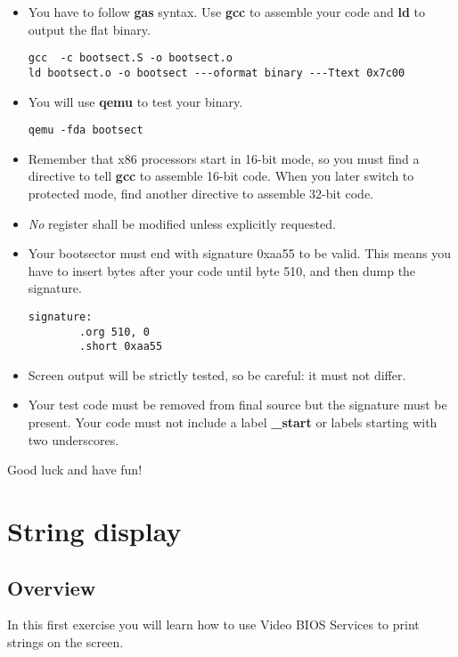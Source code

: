 \begin{itemize}
\item
  You have to follow \textbf{gas} syntax. Use \textbf{gcc} to assemble your
  code and \textbf{ld} to output the flat binary.
  \begin{verbatim}
gcc  -c bootsect.S -o bootsect.o
ld bootsect.o -o bootsect ---oformat binary ---Ttext 0x7c00
  \end{verbatim}
\item
  You will use \textbf{qemu} to test your binary.
  \begin{verbatim}
qemu -fda bootsect
  \end{verbatim}
\item
  Remember that x86 processors start in 16-bit mode, so you must find a
  directive to tell \textbf{gcc} to assemble 16-bit code. When you later
  switch to protected mode, find another directive to assemble 32-bit code.
\item
  \emph{No} register shall be modified unless explicitly requested.
\item
  Your bootsector must end with signature 0xaa55 to be valid. This means you
  have to insert bytes after your code until byte 510, and then dump the
  signature.
  \begin{verbatim}
signature:
        .org 510, 0
        .short 0xaa55
  \end{verbatim}
\item
  Screen output will be strictly tested, so be careful: it must not differ.
\item
  Your test code must be removed from final source but the signature must be
  present. Your code must not include a label \textbf{\_start} or labels
  starting with two underscores.
\end{itemize}

Good luck and have fun!

%
%

\newpage

\section{String display}

\subsection*{Overview}
In this first exercise you will learn how to use Video BIOS Services to
print strings on the screen.

